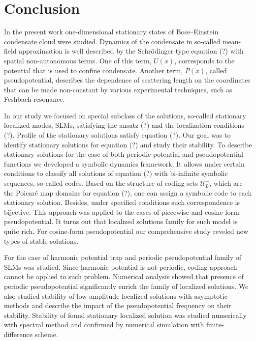 \chapter*{Conclusion}

In the present work one-dimensional stationary states of Bose--Einstein condensate cloud were studied.
Dynamics of the condensate in so-called mean-field ap­proximation is well described by the Schr\"odinger type equation {\color{red}(?)} with spatial non-au­tonomous terms.
One of this term, $U(x)$, corresponds to the potential that is used to confine condensate.
Another term, $P(x)$, called pseudopotential, describes the dependence of scattering length on the coordinates that can be made non-constant by various experimental techniques, such as Feshbach resonance.

In our study we focused on special subclass of the solutions, so-called stationary localized modes, SLMs, satisfying the ansatz {\color{red}(?)} and the localization conditions {\color{red}(?)}.
Profile of the stationary solutions satisfy equation {\color{red}(?)}.
Our goal was to identify stationary solutions for equation {\color{red}(?)} and study their stability.
To describe stationary solutions for the case of both periodic potential and pseudopotential functions we developed a symbolic dynamics framework.
It allows under certain conditions to classify all solutions of equation {\color{red}(?)} with bi-infinite symbolic sequences, so-called codes.
Based on the structure of coding sets $\mathscr{U}_L^{\pm}$, which are the Poicar\'e map domains for equation {\color{red}(?)}, one can assign a symbolic code to each stationary solution.
Besides, under specified conditions such correspondence is bijective.
This approach was applied to the cases of piecewise and cosine-form pseudopotential.
It turns out that localized solutions family for such model is quite rich.
For cosine-form pseudopotential our comprehensive study reveled new types of stable solutions.

For the case of harmonic potential trap and periodic pseudopotential family of SLMs was studied.
Since harmonic potential is not periodic, coding approach cannot be applied to such problem.
Numerical analysis showed that presence of periodic pseudopotential significantly enrich the family of localized solutions.
We also studied stability of low-amplitude localized solutions with asymptotic methods and describe the impact of the pseudopotential frequency on their  stability.
Stability of found stationary localized solution was studied numerically with spectral method and confirmed by numerical simulation with finite-difference scheme.

